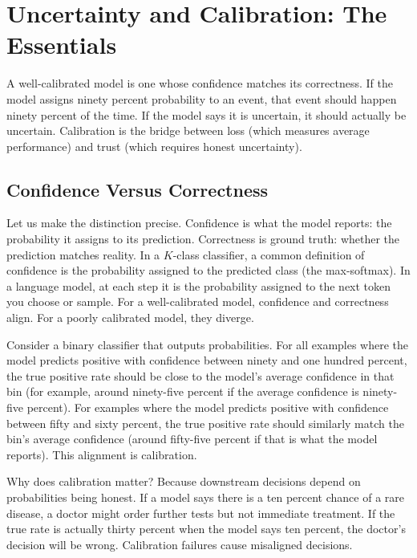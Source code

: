 \vspace{2em}

\section{Uncertainty and Calibration: The Essentials}

A well-calibrated model is one whose confidence matches its correctness. If the model assigns ninety percent probability to an event, that event should happen ninety percent of the time. If the model says it is uncertain, it should actually be uncertain. Calibration is the bridge between loss (which measures average performance) and trust (which requires honest uncertainty).

\vspace{1em}

\subsection{Confidence Versus Correctness}

Let us make the distinction precise. Confidence is what the model reports: the probability it assigns to its prediction. Correctness is ground truth: whether the prediction matches reality. In a $K$-class classifier, a common definition of confidence is the probability assigned to the predicted class (the max-softmax). In a language model, at each step it is the probability assigned to the next token you choose or sample. For a well-calibrated model, confidence and correctness align. For a poorly calibrated model, they diverge.

\vspace{0.3cm}

Consider a binary classifier that outputs probabilities. For all examples where the model predicts positive with confidence between ninety and one hundred percent, the true positive rate should be close to the model's average confidence in that bin (for example, around ninety-five percent if the average confidence is ninety-five percent). For examples where the model predicts positive with confidence between fifty and sixty percent, the true positive rate should similarly match the bin's average confidence (around fifty-five percent if that is what the model reports). This alignment is calibration.

\vspace{0.3cm}

Why does calibration matter? Because downstream decisions depend on probabilities being honest. If a model says there is a ten percent chance of a rare disease, a doctor might order further tests but not immediate treatment. If the true rate is actually thirty percent when the model says ten percent, the doctor's decision will be wrong. Calibration failures cause misaligned decisions.

